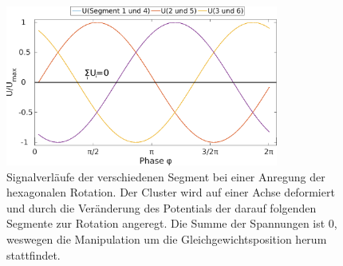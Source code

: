 \documentclass[numbers=noenddot,a4paper,notitlepage,twoside,BCOR15mm]{scrbook}
\begin{document}
								\begin{figure}[!t]
									\centering
									\includegraphics[width=0.8\textwidth]{figs/auswertung/phasen/rotationsverlauf.png}
									\caption{Signalverläufe der verschiedenen Segment bei einer Anregung der hexagonalen Rotation. Der Cluster wird auf einer Achse deformiert und durch die Veränderung des Potentials der darauf folgenden Segmente zur Rotation angeregt. Die Summe der Spannungen ist 0, weswegen die Manipulation um die Gleichgewichtsposition herum stattfindet.}\label{img:signalverlauf}
								\end{figure}
\end{document}
